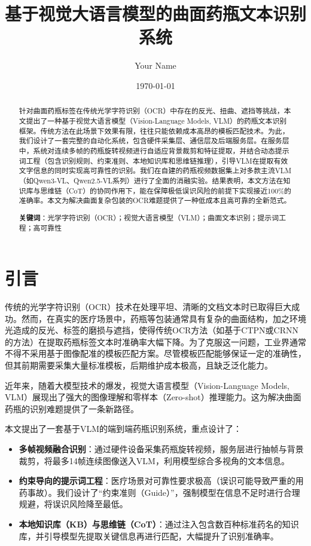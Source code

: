 \documentclass[11pt,a4paper]{ctexart}
\title{基于视觉大语言模型的曲面药瓶文本识别系统}
\author{Your Name}
\date{\today}
\begin{document}
\maketitle

\begin{abstract}
针对曲面药瓶标签在传统光学字符识别（OCR）中存在的反光、扭曲、遮挡等挑战，本文提出了一种基于视觉大语言模型（Vision-Language Models, VLM）的药瓶文本识别框架。传统方法在此场景下效果有限，往往只能依赖成本高昂的模板匹配技术。为此，我们设计了一套完整的自动化系统，包含硬件采集层、通信层及后端服务层。在服务层中，系统对连续多帧的药瓶旋转视频进行自适应背景裁剪和特征提取，并结合动态提示词工程（包含识别规则、约束准则、本地知识库和思维链推理），引导VLM在提取有效文字信息的同时实现高可靠性的识别。我们在自建的药瓶视频数据集上对多款主流VLM（如Qwen3-VL、Qwen2.5-VL系列）进行了全面的消融实验。结果表明，本文方法在知识库与思维链（CoT）的协同作用下，能在保障极低误识风险的前提下实现接近100\%的准确率。本文为解决曲面复杂包装的OCR难题提供了一种低成本且高可靠的全新范式。

\textbf{关键词}：光学字符识别（OCR）；视觉大语言模型（VLM）；曲面文本识别；提示词工程；高可靠性 \par
\end{abstract}

\section{引言}
传统的光学字符识别（OCR）技术在处理平坦、清晰的文档文本时已取得巨大成功。然而，在真实的医疗场景中，药瓶等包装通常具有复杂的曲面结构，加之环境光造成的反光、标签的磨损与遮挡，使得传统OCR方法（如基于CTPN或CRNN的方法）在提取药瓶标签文本时准确率大幅下降。为了克服这一问题，工业界通常不得不采用基于图像配准的模板匹配方案。尽管模板匹配能够保证一定的准确性，但其前期需要采集大量标准模板，后期维护成本极高，且缺乏泛化能力。

近年来，随着大模型技术的爆发，视觉大语言模型（Vision-Language Models, VLM）展现出了强大的图像理解和零样本（Zero-shot）推理能力。这为解决曲面药瓶的识别难题提供了一条新路径。

本文提出了一套基于VLM的端到端药瓶识别系统，重点设计了：
\begin{itemize}
    \item \textbf{多帧视频融合识别}：通过硬件设备采集药瓶旋转视频，服务层进行抽帧与背景裁剪，将最多14帧连续图像送入VLM，利用模型综合多视角的文本信息。
    \item \textbf{约束导向的提示词工程}：医疗场景对可靠性要求极高（误识可能导致严重的用药事故）。我们设计了“约束准则（Guide）”，强制模型在信息不足时进行合理规避，将误识风险降至最低。
    \item \textbf{本地知识库（KB）与思维链（CoT）}：通过注入包含数百种标准药名的知识库，并引导模型先提取关键信息再进行匹配，大幅提升了识别准确率。
\end{itemize}
\end{document}
